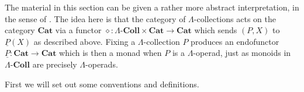 \documentclass{amsbook} %
\numberwithin{section}{chapter}
\begin{document}
\begin{rem}
The material in this section can be given a rather more abstract interpretation, in the sense of \cite{KL97}. The idea here is that the category of $\Lambda$-collections acts on the category $\mathbf{Cat}$ via a functor $\diamond \colon \Lambda\text{-}\mathbf{Coll} \times \mathbf{Cat} \rightarrow \mathbf{Cat}$ which sends $(P,X)$ to $\underline{P}(X)$ as described above. Fixing a $\Lambda$-collection $P$ produces an endofunctor $\underline{P} \colon \mathbf{Cat} \rightarrow \mathbf{Cat}$ which is then a monad when $P$ is a $\Lambda$-operad, just as monoids in $\Lambda\text{-}\mathbf{Coll}$ are precisely $\Lambda$-operads.
\end{rem}

%
%
First we will set out some conventions and definitions.
\end{document}
